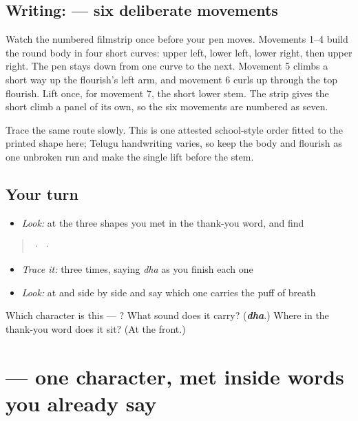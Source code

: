 \subsection*{Writing:  — six deliberate movements}

Watch the numbered filmstrip once before your pen moves. Movements 1–4 build the round body in four short curves: upper left, lower left, lower right, then upper right. The pen stays down from one curve to the next. Movement 5 climbs a short way up the flourish's left arm, and movement 6 curls up through the top flourish. Lift once, for movement 7, the short lower stem. The strip gives the short climb a panel of its own, so the six movements are numbered as seven.

Trace the same route slowly. This is one attested school-style order fitted to the printed shape here; Telugu handwriting varies, so keep the body and flourish as one unbroken run and make the single lift before the stem.

\subsection*{Your turn}
\begin{itemize}
\raggedright
  \item \emph{Look:} at the three shapes you met in the thank-you word, and find 
\end{itemize}

\begin{quote}
  ·    ·  
\end{quote}

\begin{itemize}
\raggedright
  \item \emph{Trace it:}  three times, saying \emph{dha} as you finish each one
  \item \emph{Look:} at  and  side by side and say which one carries the puff of breath
\end{itemize}

\begin{tcolorbox}[breakable,colback=teal!4,colframe=teal!35!black,title={Before you move on}]
Which character is this — ? What sound does it carry? (\emph{\textbf{dha}}.) Where in the thank-you word does it sit? (At the front.)
\end{tcolorbox}
\section[\texorpdfstring{\te{క} (ka)}{క (ka)}]{ — one character, met inside words you already say}

